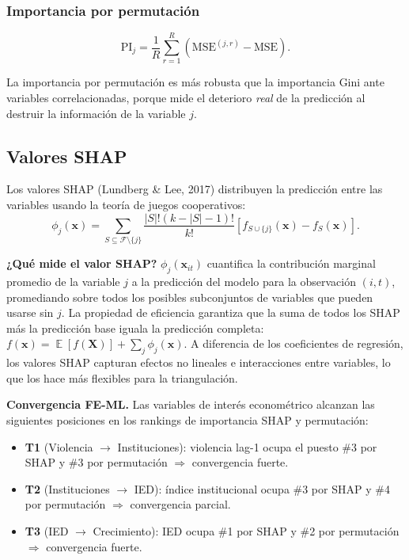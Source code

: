\documentclass[12pt, a4paper]{article}
\theoremstyle{definition}
\DeclareMathOperator{\E}{\mathbb{E}}
\begin{document}
\subsubsection{Importancia por permutación}

\[
  \mathrm{PI}_j = \frac{1}{R}\sum_{r=1}^{R}\left(\mathrm{MSE}^{(j,r)} - \mathrm{MSE}\right).
\]

La importancia por permutación es más robusta que la importancia Gini ante variables correlacionadas, porque mide el deterioro \emph{real} de la predicción al destruir la información de la variable $j$.

\subsection{Valores SHAP}

Los valores SHAP (Lundberg \& Lee, 2017) distribuyen la predicción entre las variables usando la teoría de juegos cooperativos:
\[
  \phi_j(\bm{x}) = \sum_{S \subseteq \mathcal{F}\setminus\{j\}} \frac{|S|!(k-|S|-1)!}{k!}\left[f_{S\cup\{j\}}(\bm{x}) - f_S(\bm{x})\right].
\]

\begin{intuitionbox}
\textbf{¿Qué mide el valor SHAP?} $\phi_j(\bm{x}_{it})$ cuantifica la contribución marginal promedio de la variable $j$ a la predicción del modelo para la observación $(i,t)$, promediando sobre todos los posibles subconjuntos de variables que pueden usarse sin $j$. La propiedad de eficiencia garantiza que la suma de todos los SHAP más la predicción base iguala la predicción completa: $f(\bm{x}) = \E[f(\bm{X})] + \sum_j \phi_j(\bm{x})$. A diferencia de los coeficientes de regresión, los valores SHAP capturan efectos no lineales e interacciones entre variables, lo que los hace más flexibles para la triangulación.
\end{intuitionbox}

\begin{resultbox}
\textbf{Convergencia FE-ML.} Las variables de interés econométrico alcanzan las siguientes posiciones en los rankings de importancia SHAP y permutación:
\begin{itemize}
  \item \textbf{T1} (Violencia $\to$ Instituciones): violencia lag-1 ocupa el puesto \#3 por SHAP y \#3 por permutación $\Rightarrow$ convergencia fuerte.
  \item \textbf{T2} (Instituciones $\to$ IED): índice institucional ocupa \#3 por SHAP y \#4 por permutación $\Rightarrow$ convergencia parcial.
  \item \textbf{T3} (IED $\to$ Crecimiento): IED ocupa \#1 por SHAP y \#2 por permutación $\Rightarrow$ convergencia fuerte.
\end{itemize}
\end{resultbox}
\end{document}
